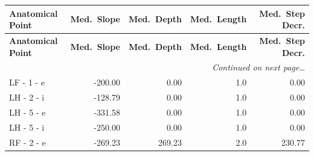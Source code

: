 \documentclass[a4paper,11pt]{article}
\begin{document}
\begin{small}
\begin{longtable}{p{4.5cm}rrrr}
\toprule
\textbf{Anatomical Point} &
\textbf{Med.\ Slope} &
\textbf{Med.\ Depth} &
\textbf{Med.\ Length} &
\textbf{Med.\ Step Decr.} \\
\midrule
\endfirsthead
\toprule
\textbf{Anatomical Point} &
\textbf{Med.\ Slope} &
\textbf{Med.\ Depth} &
\textbf{Med.\ Length} &
\textbf{Med.\ Step Decr.} \\
\midrule
\endhead
\midrule
\multicolumn{5}{r}{\small\emph{Continued on next page\ldots}} \\
\endfoot
\bottomrule
\endlastfoot
LF - 1 - e & -200.00 & 0.00 & 1.0 & 0.00 \\
LH - 2 - i & -128.79 & 0.00 & 1.0 & 0.00 \\
LH - 5 - e & -331.58 & 0.00 & 1.0 & 0.00 \\
LH - 5 - i & -250.00 & 0.00 & 1.0 & 0.00 \\
RF - 2 - e & -269.23 & 269.23 & 2.0 & 230.77 \\
\end{longtable}
\end{small}
\end{document}
